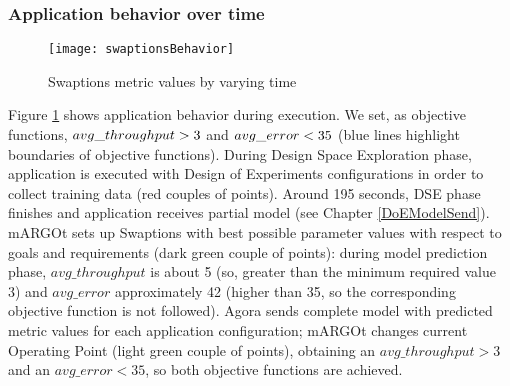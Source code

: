 \subsubsection{Application behavior over time}

\begin{figure}[htb]

    \centering
    
    \texttt{[image: swaptionsBehavior]}
    
    \caption{Swaptions metric values by varying time}
    
    \label{fig::sw::beh}
    
\end{figure}

Figure \ref{fig::sw::beh} shows application behavior during execution. We set, as objective functions, $avg\_\-throughput > 3$ and $avg\_\-error < 35$ (blue lines highlight boundaries of objective functions). During Design Space Exploration phase, application is executed with Design of Experiments configurations in order to collect training data (red couples of points). Around 195 seconds, DSE phase finishes and application receives partial model (see Chapter \ref{DoEModelSend}). mARGOt sets up Swaptions with best possible parameter values with respect to goals and requirements (dark green couple of points): during model prediction phase, $avg\_throughput$ is about 5 (so, great\-er than the minimum required value 3) and $avg\_error$ approximately 42 (higher than 35, so the corresponding objective function is not followed). Agora sends complete model with predicted metric values for each application configuration; mARGOt changes current Operating Point (light green couple of points), obtaining an $avg\_throughput > 3$ and an $avg\_error < 35$, so both objective functions are achieved. 
